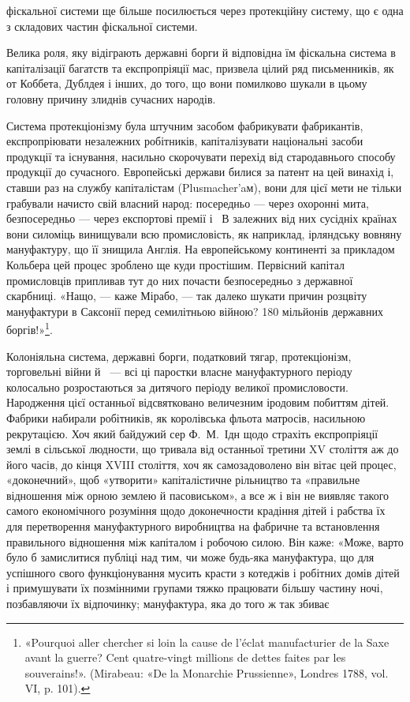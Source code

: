 \parcont{}  %
фіскальної системи ще більше посилюється через протекційну систему, що є одна з складових частин
фіскальної системи.

Велика роля, яку відіграють державні борги й відповідна їм фіскальна система в капіталізації
багатств та експропріяції мас, призвела цілий ряд письменників, як от Коббета, Дублдея і інших, до
того, що вони помилково шукали в цьому головну
причину злиднів сучасних народів.

Система протекціонізму була штучним засобом фабрикувати фабрикантів, експропріювати незалежних
робітників, капіталізувати національні засоби продукції та існування, насильно скорочувати перехід
від стародавнього способу продукції до сучасного. Европейські держави билися за патент на цей
винахід і, ставши раз на службу капіталістам (Plusmacher’aм), вони для цієї мети не тільки грабували
начисто свій власний народ: посередньо — через охоронні мита, безпосередньо — через експортові
премії і~ В залежних від них сусідніх країнах вони силоміць
винищували всю промисловість, як наприклад, ірляндську вовняну мануфактуру, що її знищила Англія. На
европейському континенті за прикладом Кольбера цей процес зроблено ще куди простішим. Первісний
капітал промисловців припливав тут до
них почасти безпосередньо з державної скарбниці. «Нащо, — каже Мірабо, — так далеко шукати причин
розцвіту мануфактури в Саксонії перед семилітньою війною? 180 мільйонів державних боргів!»\footnote{
«Pourquoi aller chercher si loin la cause de l’éclat manufacturier de la Saxe avant la guerre?
Cent quatre-vingt millions de dettes faites par les souverains!». (Mirabeau: «De la Monarchie
Prussienne», Londres 1788, vol. VI, p. 101).
}.

Колоніяльна система, державні борги, податковий тягар, протекціонізм, торговельні війни й~ —
всі ці паростки власне мануфактурного періоду колосально розростаються за дитячого періоду великої
промисловости. Народження цієї останньої
відсвятковано величезним іродовим побиттям дітей. Фабрики набирали робітників, як королівська фльота
матросів, насильною рекрутацією. Хоч який байдужий сер Ф.~М.~Ідн щодо страхіть експропріяції землі в
сільської людности, що тривала від останньої
третини XV століття аж до його часів, до кінця XVIII століття, хоч як самозадоволено він вітає цей
процес, «доконечний», щоб «утворити» капіталістичне рільництво та «правильне відношення між орною
землею й пасовиськом», а все ж і він не виявляє такого самого економічного розуміння щодо
доконечности крадіння дітей і рабства їх для перетворення мануфактурного виробництва на фабричне та
встановлення правильного відношення між капіталом і робочою силою. Він каже: «Може, варто було б
замислитися публіці над тим, чи може будь-яка мануфактура, що для успішного свого функціонування
мусить красти з котеджів і робітних домів дітей і примушувати їх позмінними групами тяжко працювати
більшу частину ночі, позбавляючи їх відпочинку; мануфактура, яка до того ж так збиває
\parbreak{}  %
